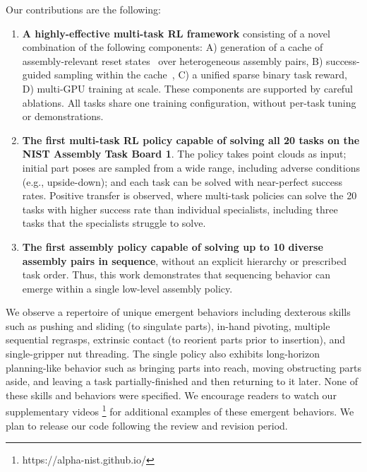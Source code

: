 Our contributions are the following:
\begin{enumerate}
    \item \textbf{A highly-effective multi-task RL framework} consisting of a novel combination of the following components: A) generation of a cache of assembly-relevant reset states~\cite{yin2026omnireset} over heterogeneous assembly pairs, B) success-guided sampling within the cache~\cite{zhang2026balanceddiet}, C) a unified sparse binary task reward, D) multi-GPU training at scale. These components are supported by careful ablations. All tasks share one training configuration, without per-task tuning or demonstrations.
    \item \textbf{The first multi-task RL policy capable of solving all 20 tasks on the NIST Assembly Task Board 1}. The policy takes point clouds as input; initial part poses are sampled from a wide range, including adverse conditions (e.g., upside-down); and each task can be solved with near-perfect success rates. Positive transfer is observed, where multi-task policies can solve the 20 tasks with higher success rate than individual specialists, including three tasks that the specialists struggle to solve.
    \item \textbf{The first assembly policy capable of solving up to 10 diverse assembly pairs in sequence}, without an explicit hierarchy or prescribed task order. Thus, this work demonstrates that sequencing behavior can emerge within a single low-level assembly policy.
\end{enumerate}

We observe a repertoire of unique emergent behaviors including dexterous skills such as pushing and sliding (to singulate parts), in-hand pivoting, multiple sequential regrasps, extrinsic contact (to reorient parts prior to insertion), and single-gripper nut threading.
The single policy also exhibits long-horizon planning-like behavior such as bringing parts into reach, moving obstructing parts aside, and leaving a task partially-finished and then returning to it later. None of these skills and behaviors were specified.
We encourage readers to watch our supplementary videos \footnote{https://alpha-nist.github.io/} for additional examples of these emergent behaviors.
We plan to release our code following the review and revision period.





